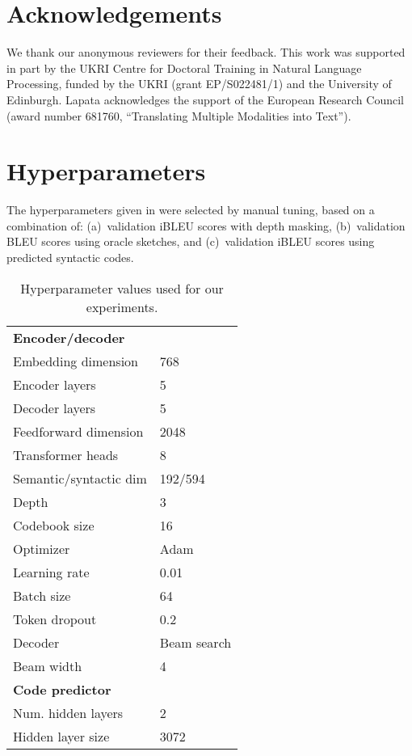 \documentclass[11pt]{article}
\begin{document}
\section*{Acknowledgements}

We thank our anonymous reviewers for their feedback. This work was supported in part by the
UKRI Centre for Doctoral Training in Natural Language Processing,
funded by the UKRI (grant EP/S022481/1) and the University of
Edinburgh. Lapata acknowledges the support of the European Research
Council (award number 681760, ``Translating Multiple Modalities into
Text'').




\appendix



\section{Hyperparameters}
\label{app:hyperparams}

The hyperparameters given in  were selected by manual tuning, based on a combination
of: (a)~validation iBLEU scores with depth masking, (b)~validation BLEU scores
using oracle sketches, and (c)~validation iBLEU scores using
predicted syntactic codes.

\begin{table}[ht]
    \centering
\small
    \begin{tabular}{l|p{2cm}}
    \textbf{Encoder/decoder} & \\
    Embedding dimension  & 768 \\
    Encoder layers & 5 \\
    Decoder layers & 5 \\
    Feedforward dimension & 2048 \\
    Transformer heads & 8 \\
    Semantic/syntactic dim & 192/594 \\
    Depth & 3 \\
    Codebook size & 16 \\
    Optimizer & Adam \cite{adam} \\
    Learning rate & 0.01 \\
    Batch size & 64 \\
    Token dropout & 0.2 \cite{tokendropout} \\
    Decoder & Beam search \\
    Beam width & 4 \\
    \hline
    \textbf{Code predictor} & \\
    Num. hidden layers & 2 \\
    Hidden layer size & 3072 \\
    
    \end{tabular}
    \caption{Hyperparameter values used for our experiments.}
    \label{tab:hyperparams}
\end{table}
\end{document}
